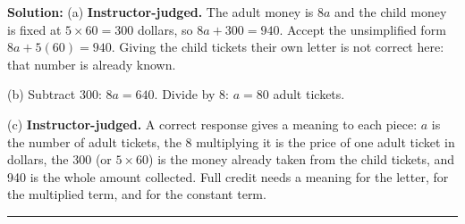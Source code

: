 \documentclass[12pt]{article}
\begin{document}
\textbf{Solution:} (a) \textbf{Instructor-judged.} The adult money is $8a$ and
the child money is fixed at $5 \times 60 = 300$ dollars, so
$8a + 300 = 940$. Accept the unsimplified form $8a + 5(60) = 940$. Giving the
child tickets their own letter is not correct here: that number is already
known.

(b) Subtract 300: $8a = 640$. Divide by 8: $a = 80$ adult
tickets. 

(c) \textbf{Instructor-judged.} A correct response gives a meaning to each
piece: $a$ is the number of adult tickets, the 8 multiplying it is the price of
one adult ticket in dollars, the 300 (or $5 \times 60$) is the money already
taken from the child tickets, and 940 is the whole amount collected. Full credit
needs a meaning for the letter, for the multiplied term, and for the constant
term.

\vspace{0.25cm}\noindent\rule{\linewidth}{0.2pt}\vspace{0.25cm}
\end{document}

